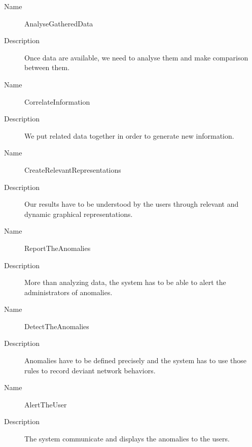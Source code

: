 \begin{description}
  \item[Name] AnalyseGatheredData
  \item[Description] Once data are available, we need to analyse them and make comparison between them.
\end{description}

\begin{description}
  \item[Name] CorrelateInformation
  \item[Description] We put related data together in order to generate new information.
\end{description}

\begin{description}
  \item[Name] CreateRelevantRepresentations
  \item[Description] Our results have to be understood by the users through relevant and dynamic graphical representations.
\end{description}

\begin{description}
  \item[Name] ReportTheAnomalies
  \item[Description] More than analyzing data, the system has to be able to alert the administrators of anomalies.
\end{description}

\begin{description}
  \item[Name] DetectTheAnomalies
  \item[Description] Anomalies have to be defined precisely and the system has to use those rules to record deviant network behaviors.
\end{description}

\begin{description}
  \item[Name] AlertTheUser
  \item[Description] The system communicate and displays the anomalies to the users.
\end{description}


